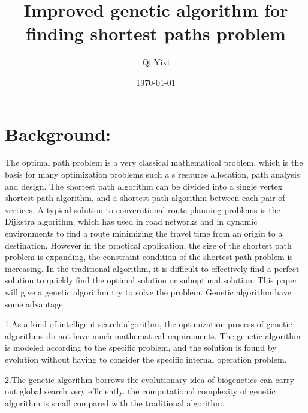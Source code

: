 \documentclass[12pt]{article}
\title{Improved genetic algorithm for finding shortest paths problem}
\author{Qi Yixi}
\date{\today}
\begin{document}
\maketitle{}
\section{Background:}

	The optimal path problem is a very classical mathematical problem, which is the basis for many optimization problems such a s resource allocation, path analysis and design. The shortest path algorithm can be divided into a single vertex shortest path algorithm, and a shortest path algorithm between each pair of vertices. A typical solution to converntional route planning problems is the Dijkstra algorithm, which has used in road networks and in dynamic environments to find a route minimizing the travel time from an origin to a destination. However in the practical application, the size of the shortest path problem is expanding, the constraint condition of the shortest path problem is increasing. In the traditional algorithm, it is difficult to effectively find a perfect solution to quickly find the optimal solution or suboptimal solution. This paper will give a genetic algorithm try to solve the problem.
Genetic algorithm have some advantage:

1.As a kind of intelligent search algorithm, the optimization process of genetic algorithms do not have much mathematical requirements. The genetic algorithm is modeled according to the specific problem, and the solution is found by evolution without having to consider the specific internal operation problem.

2.The genetic algorithm borrows the evolutionary idea of biogenetics can carry out global search very efficiently. the computational complexity of genetic algorithm is small compared with the traditional algorithm.
\end{document}
